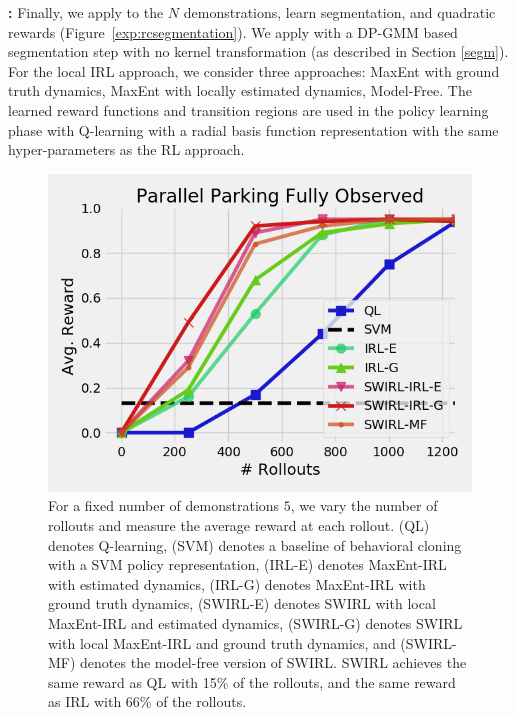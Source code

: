 \vspace{0.25em}\noindent \textbf{\hirl: } Finally, we apply \hirl to the $N$ demonstrations, learn segmentation, and quadratic rewards (Figure~\ref{exp:rcsegmentation}).
We apply \hirl with a DP-GMM based segmentation step with no kernel transformation (as described in Section \ref{segm}).
For the local IRL approach, we consider three approaches: MaxEnt with ground truth dynamics, MaxEnt with locally estimated dynamics, Model-Free. 
The learned reward functions and transition regions are used in the policy learning phase with Q-learning with a radial basis function representation with the same hyper-parameters as the RL approach.

\vspace{0.5em}

\begin{figure}[t]
\centering
 \includegraphics[width=0.8\columnwidth]{new-exp/pp-fo.png}
 \caption{For a fixed number of demonstrations $5$, we vary the number of rollouts and measure the average reward at each rollout. (QL) denotes Q-learning, (SVM) denotes a baseline of behavioral cloning with a SVM policy representation, (IRL-E) denotes MaxEnt-IRL with estimated dynamics, (IRL-G) denotes MaxEnt-IRL with ground truth dynamics, (SWIRL-E) denotes SWIRL with local MaxEnt-IRL and estimated dynamics, (SWIRL-G) denotes SWIRL with local MaxEnt-IRL and ground truth dynamics, and (SWIRL-MF) denotes the model-free version of SWIRL. SWIRL achieves the same reward as QL with 15\% of the rollouts, and the same reward as IRL with 66\% of the rollouts. \label{exp:pp-fo1}}
\end{figure}

